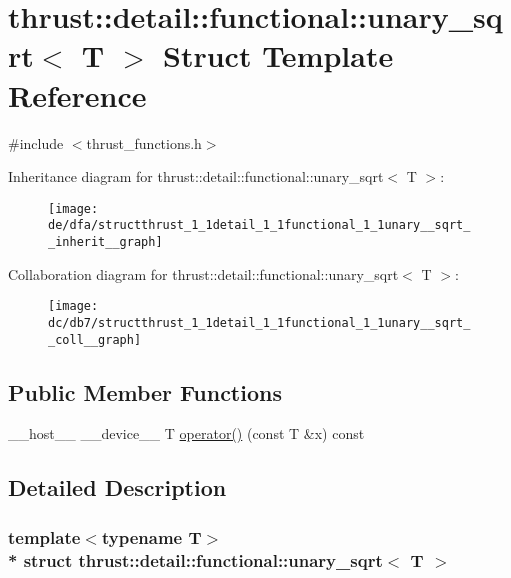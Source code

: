 \hypertarget{structthrust_1_1detail_1_1functional_1_1unary__sqrt}{}\section{thrust\+:\+:detail\+:\+:functional\+:\+:unary\+\_\+sqrt$<$ T $>$ Struct Template Reference}
\label{structthrust_1_1detail_1_1functional_1_1unary__sqrt}


{\ttfamily \#include $<$thrust\+\_\+functions.\+h$>$}



Inheritance diagram for thrust\+:\+:detail\+:\+:functional\+:\+:unary\+\_\+sqrt$<$ T $>$\+:
\nopagebreak
\begin{figure}[H]
\begin{center}
\leavevmode
\texttt{[image: de/dfa/structthrust\_1\_1detail\_1\_1functional\_1\_1unary\_\_sqrt\_\_inherit\_\_graph]}
\end{center}
\end{figure}


Collaboration diagram for thrust\+:\+:detail\+:\+:functional\+:\+:unary\+\_\+sqrt$<$ T $>$\+:
\nopagebreak
\begin{figure}[H]
\begin{center}
\leavevmode
\texttt{[image: dc/db7/structthrust\_1\_1detail\_1\_1functional\_1\_1unary\_\_sqrt\_\_coll\_\_graph]}
\end{center}
\end{figure}
\subsection*{Public Member Functions}
\begin{DoxyCompactItemize}
\item 
\+\_\+\+\_\+host\+\_\+\+\_\+ \+\_\+\+\_\+device\+\_\+\+\_\+ T \hyperlink{structthrust_1_1detail_1_1functional_1_1unary__sqrt_adb167ff466f3418c48469ea2042dcc28}{operator()} (const T \&x) const 
\end{DoxyCompactItemize}


\subsection{Detailed Description}
\subsubsection*{template$<$typename T$>$\\*
struct thrust\+::detail\+::functional\+::unary\+\_\+sqrt$<$ T $>$}



